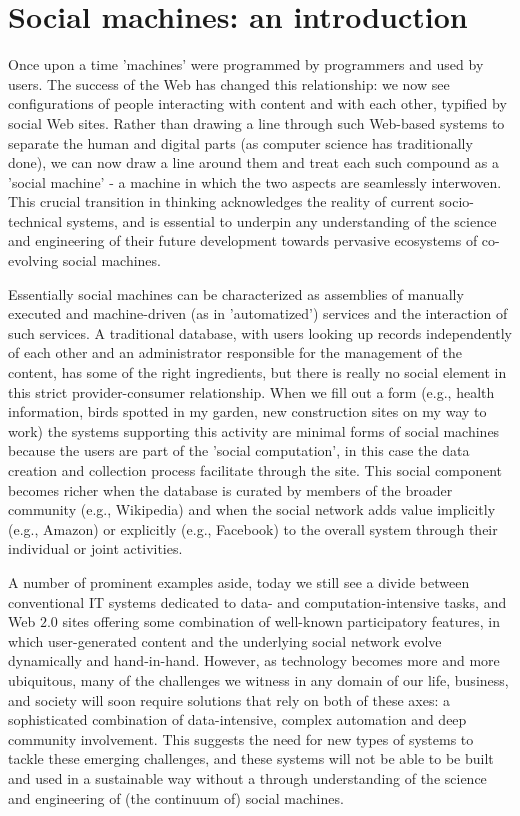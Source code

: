 \documentclass{sig-alternate}
\begin{document}
\section{Social machines: an introduction}
Once upon a time 'machines' were programmed by programmers and used by users. The success of the Web has changed this relationship: we now see configurations of people interacting with content and with each other, typified by social Web sites. Rather than drawing a line through such Web-based systems to separate the human and digital parts (as computer science has traditionally done), we can now draw a line around them  and  treat  each  such  compound  as  a  'social  machine'  -  a  machine in which the two aspects are seamlessly interwoven. This crucial transition in thinking acknowledges the reality of current socio-technical systems, and is essential to underpin any understanding of the science and engineering of their future development towards pervasive ecosystems of co-evolving social machines.

Essentially social machines can be characterized as assemblies of manually executed and machine-driven (as in 'automatized') services and the interaction of such services. A  traditional  database,  with  users  looking  up  records  independently  of  each  other  and  an  administrator responsible for the management of the content, has some of the right ingredients, but there is really no social element in this strict provider-consumer relationship. When we fill out a form (e.g., health information, birds spotted in my garden, new construction sites on my way to work) the systems supporting this activity are minimal forms of social machines  because the users  are  part  of  the  'social  computation', in this case the data creation and collection process facilitate through the site.  This social component  becomes  richer when  the database  is  curated by members  of  the broader community (e.g., Wikipedia) and when  the social network adds value implicitly (e.g., Amazon) or explicitly (e.g., Facebook) to the overall system through their individual or joint activities.

A number of prominent examples aside, today we still see a divide between conventional IT systems dedicated to data- and computation-intensive tasks, and Web $2.0$ sites offering some combination of well-known participatory features, in which user-generated content and the underlying social network evolve dynamically and hand-in-hand. However, as technology becomes more and more ubiquitous, many of the challenges we witness in any domain of our life, business, and society will soon require solutions that rely on both of these axes: a sophisticated  combination  of  data-intensive, complex automation and deep community involvement. This suggests the need for new types of systems to tackle these emerging challenges, and these systems will not be able to be built and used in a sustainable way without a through understanding of the science and engineering of (the continuum of) social machines.
\end{document}
